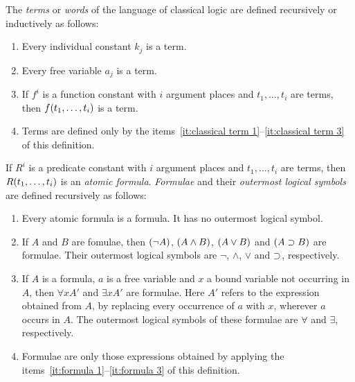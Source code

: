 \documentclass[11pt,a4paper]{article}
\begin{document}
\begin{definition}[Term]%
    \label{def:classical term}
    The \emph{terms} or \emph{words} of the language of classical logic are defined recursively or inductively as follows:
    \begin{enumerate}
        \item\label{it:classical term 1}
            Every individual constant \(k_j\) is a term.
        \item\label{it:classical term 2}
            Every free variable \(a_j\) is a term.
        \item\label{it:classical term 3}
            If \(f^i\) is a function constant with \(i\) argument places and \(t_1,\ldots,t_i\) are terms,
            then \(f(t_1,\ldots,t_i)\) is a term.
        \item\label{it:classical term4}
            Terms are defined only by the items~\ref{it:classical term 1}--\ref{it:classical term 3} of this definition.
    \end{enumerate}
\end{definition}

\begin{definition}%
    \label{def:formulae and outermost logical symbols}
    If \(R^i\) is a predicate constant with \(i\) argument places and \(t_1,\ldots,t_i\) are terms,
    then \(R(t_1,\ldots,t_i)\) is an \emph{atomic formula}.
    \emph{Formulae} and their \emph{outermost logical symbols} are defined recursively as follows:
    \begin{enumerate}
        \item\label{it:formula 1}
            Every atomic formula is a formula. It has no outermost logical symbol.
        \item\label{it:formula 2}
            If \(A\) and \(B\) are fomulae, then \((\lnot A)\), \((A\land B)\),
            \((A\lor B)\) and \((A\supset B)\) are formulae.
            Their outermost logical symbols are \(\lnot\), \(\land\),
            \(\lor\) and \(\supset\), respectively.
        \item\label{it:formula 3}
            If \(A\) is a formula, \(a\) is a free variable and \(x\)
            a bound variable not occurring in \(A\),
            then \(\forall x A'\) and \(\exists x A'\) are formulae.
            Here \(A'\) refers to the expression obtained from \(A\),
            by replacing every occurrence of \(a\) with \(x\), wherever \(a\)
            occurs in \(A\).
            The outermost logical symbols of these formulae are \(\forall\) and \(\exists\), respectively.
        \item\label{it:formula 4}
            Formulae are only those expressions obtained by applying
            the items~\ref{it:formula 1}--\ref{it:formula 3}
            of this definition.
    \end{enumerate}
\end{definition}
\end{document}
